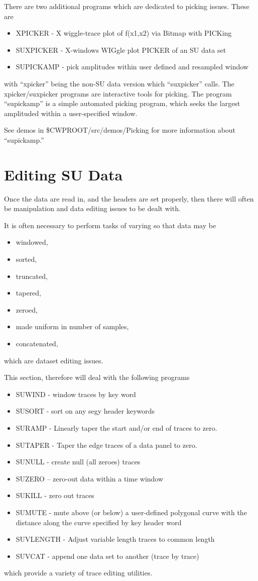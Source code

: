 {{{{{{{There are two additional programs which are dedicated to picking
issues. These are
\begin{itemize}
\item XPICKER - X wiggle-trace plot of f(x1,x2) via Bitmap with PICKing 
\item SUXPICKER - X-windows  WIGgle plot PICKER of an SU data set
\item SUPICKAMP - pick amplitudes within user defined and resampled window 
\end{itemize}
with ``xpicker'' being the non-SU data version which ``suxpicker''
calls. The xpicker/suxpicker programs are interactive tools for picking.
The program ``supickamp'' is a simple automated picking program,
which seeks the largest amplituded within a user-specified window.

See demos in \$CWPROOT/src/demos/Picking
for more information about ``supickamp.''

\section{Editing SU Data}

Once the data are read in, and the headers are set properly,
then there will often be manipulation and data editing issues
to be dealt with.

It is often necessary to perform tasks of varying so
that data may be
\begin{itemize}
\item windowed,
\item sorted,
\item truncated,
\item tapered,
\item zeroed,
\item made uniform in number of samples,
\item concatenated,
\end{itemize}
which are dataset editing issues.

This section, therefore will deal with the following programs
\begin{itemize}
\item SUWIND - window traces by key word 
\item SUSORT - sort on any segy header keywords 
\item SURAMP - Linearly taper the start and/or end of traces to zero. 
\item SUTAPER - Taper the edge traces of a data panel to zero. 
\item SUNULL - create null (all zeroes) traces 
\item SUZERO -- zero-out data within a time window
\item SUKILL - zero out traces 
\item SUMUTE - mute above (or below) a user-defined polygonal curve with
the distance along the curve specified by key header word
\item SUVLENGTH - Adjust variable length traces to common length 
\item SUVCAT - append one data set to another (trace by trace)
\end{itemize}
which provide a variety of trace editing utilities.

}}}}}}}
